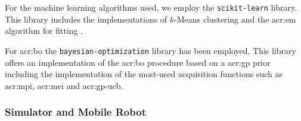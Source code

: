 For the machine learning algorithms used, we employ the \texttt{scikit-learn} library.
This library includes the implementations of $k$-Means clustering and the \acrshort{acr:em} algorithm for fitting .

For \acrlong{acr:bo} the \texttt{bayesian-optimization} library \cite{nogueirabayesianoptimization} has been employed.
This library offers an implementation of the \acrshort{acr:bo} procedure based on a \acrshort{acr:gp} prior including the implementation of the most-used acquisition functions such as \acrshort{acr:mpi}, \acrshort{acr:mei} and \acrshort{acr:gp-ucb}.


\subsubsection{Simulator and Mobile Robot}


